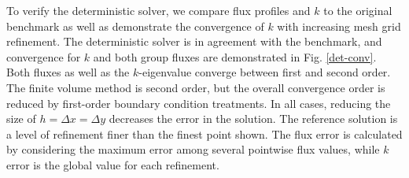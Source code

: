 \documentclass[11pt]{article}
\begin{document}
To verify the deterministic solver, we compare flux profiles and $k$ to the original benchmark\cite{benchmark} as well as demonstrate the convergence of $k$ with increasing mesh grid refinement.  The deterministic solver is in agreement with the benchmark, and convergence for $k$ and both group fluxes are demonstrated in Fig. \ref{det-conv}.  Both fluxes as well as the $k$-eigenvalue converge between first and second order.  The finite volume method is second order, but the overall convergence order is reduced by first-order boundary condition treatments.  In all cases, reducing the size of $h=\Delta x=\Delta y$ decreases the error in the solution.  The reference solution is a level of refinement finer than the finest point shown.   The flux error is calculated by considering the maximum error among several pointwise flux values, while $k$ error is the global value for each refinement.
\end{document}
